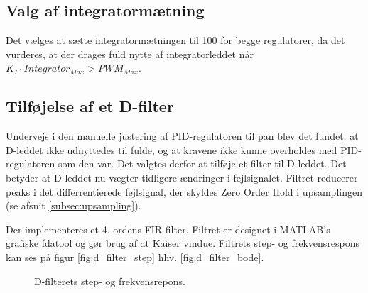 \subsection{Valg af integratormætning}
Det vælges at sætte integratormætningen til 100 for begge regulatorer, da det vurderes, at der drages
fuld nytte af integratorleddet når \( K_I \cdot Integrator_{Max} > PWM_{Max} \).

\subsection{Tilføjelse af et D-filter}
Undervejs i den manuelle justering af PID-regulatoren til pan blev det fundet, at D-leddet ikke udnyttedes til fulde,
og at kravene ikke kunne overholdes med PID-regulatoren som den var.
Det valgtes derfor at tilføje et filter til D-leddet. 
Det betyder at D-leddet nu vægter tidligere ændringer i fejlsignalet. 
Filtret reducerer peaks i det differrentierede fejlsignal, der skyldes Zero Order Hold i upsamplingen (se afsnit \ref{subsec:upsampling}).

Der implementeres et 4. ordens FIR filter. Filtret er designet i MATLAB's grafiske fdatool og gør brug af at Kaiser vindue.
Filtrets step- og frekvensrespons kan ses på figur \ref{fig:d_filter_step} hhv. \ref{fig:d_filter_bode}. 

\begin{figure}[h!]
\centering
{}
\caption[D-filterets respons]{D-filterets step- og frekvensrepons.}
\label{fig:d_filter}
\end{figure}

